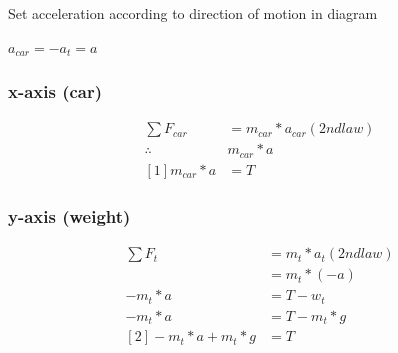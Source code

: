 \documentclass{article}
\begin{document}
\begin{figure}[H]
\end{figure}

Set acceleration according to direction of motion in diagram
\begin{center}
$a_{car} = -a_{t} = a$
\end{center}

\subsubsection{x-axis (car)}
\begin{align*}
\sum{F_{car}} 		& = m_{car} * a_{car}	(2nd law) \\
\therefore 			& m_{car} * a \\
[1] m_{car} * a 			& = T
\end{align*}

\subsubsection{y-axis (weight)}
\begin{align*}
\sum{F_{t}} 		& = m_{t} * a_{t}	(2nd law) \\
				& = m_{t} * (-a) \\
-m_{t}*a 		& = T - w_{t} \\
-m_{t}*a 		& = T - m_{t}*g \\
[2] -m_{t}*a + m_{t}* g		& = T
\end{align*}
\end{document}

